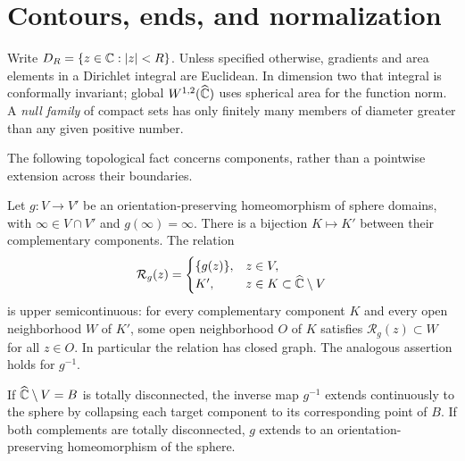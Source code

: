 \section{Contours, ends, and normalization}\label{sec:preliminaries}

Write $D_R=\{z\in\mathbb C:|z|<R\}$.  Unless specified otherwise, gradients
and area elements in a Dirichlet integral are Euclidean.  In dimension
two that integral is conformally invariant; global $W^{1,2}(\widehat{\mathbb C})$
uses spherical area for the function norm.  A \emph{null family} of
compact sets has only finitely many members of diameter greater than
any given positive number.

The following topological fact concerns components, rather than a
pointwise extension across their boundaries.

\begin{lemma}\label{lem:ends}
Let $g:V\to V'$ be an orientation-preserving homeomorphism of sphere
domains, with $\infty\in V\cap V'$ and $g(\infty)=\infty$.
There is a bijection $K\mapsto K'$ between their complementary
components.  The relation
\[
 \mathcal R_g(z)=
 \begin{cases}
 \{g(z)\},&z\in V,\\
 K',&z\in K\subset\widehat{\mathbb C}\setminus V
 \end{cases}
\]
is upper semicontinuous: for every complementary component $K$ and
every open neighborhood $W$ of $K'$, some open neighborhood $O$ of
$K$ satisfies $\mathcal R_g(z)\subset W$ for all $z\in O$.
In particular the relation has closed graph.  The analogous assertion
holds for $g^{-1}$.

If $\widehat{\mathbb C}\setminus V=B$ is totally disconnected, the inverse map
$g^{-1}$ extends continuously to the sphere by collapsing each
target component to its corresponding point of $B$.  If both
complements are totally disconnected, $g$ extends to an
orientation-preserving homeomorphism of the sphere.
\end{lemma}

